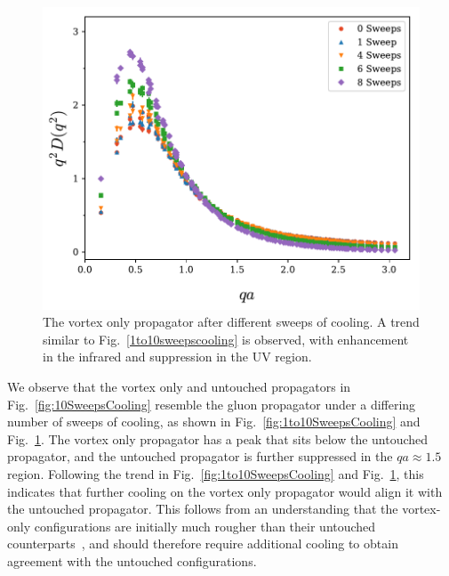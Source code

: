 %
\begin{figure}[tb]
\centering
\includegraphics[width=\linewidth]{./ScalarGluComp_q2_1to10sweepsVO.pdf}
\caption{\label{fig:1to10VO}The vortex only propagator after different sweeps of cooling. A trend similar to Fig.~\ref{1to10sweepscooling} is observed, with enhancement in the infrared and suppression in the UV region.}
\end{figure}
%
We observe that the vortex only and untouched propagators in Fig.~\ref{fig:10SweepsCooling} resemble the gluon propagator under a differing number of sweeps of cooling, as shown in Fig.~\ref{fig:1to10SweepsCooling} and Fig.~\ref{fig:1to10VO}. The vortex only propagator has a peak that sits below the untouched propagator, and the untouched propagator is further suppressed in the $qa\approx 1.5$ region. Following the trend in Fig.~\ref{fig:1to10SweepsCooling} and Fig.~\ref{fig:1to10VO}, this indicates that further cooling on the vortex only propagator would align it with the untouched propagator. This follows from an understanding that the vortex-only configurations are initially much rougher than their untouched counterparts~\cite{Trewartha:2015nna}, and should therefore require additional cooling to obtain agreement with the untouched configurations.\\
%
